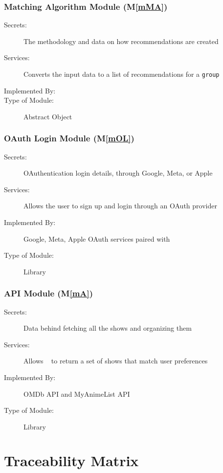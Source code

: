 \documentclass[12pt, titlepage]{article}
\newcommand{\mref}[1]{M\ref{#1}}
\begin{document}
\subsubsection{Matching Algorithm Module (\mref{mMA})}

\begin{description}
\item[Secrets:] The methodology and data on how recommendations are created
\item[Services:] Converts the input data to a list of recommendations for a \verb_group_
\item[Implemented By:] \progname
\item[Type of Module:] Abstract Object
\end{description}

\subsubsection{OAuth Login Module (\mref{mOL})}

\begin{description}
\item[Secrets:] OAuthentication login details, through Google, Meta, or Apple
\item[Services:] Allows the user to sign up and login through an OAuth provider
\item[Implemented By:] Google, Meta, Apple OAuth services paired with \progname
\item[Type of Module:] Library
\end{description}

\subsubsection{API Module (\mref{mA})}

\begin{description}
\item[Secrets:] Data behind fetching all the shows and organizing them
\item[Services:] Allows \progname ~ to return a set of shows that match user preferences
\item[Implemented By:] OMDb API and MyAnimeList API
\item[Type of Module:] Library
\end{description}

\section{Traceability Matrix} \label{SecTM}
\end{document}
